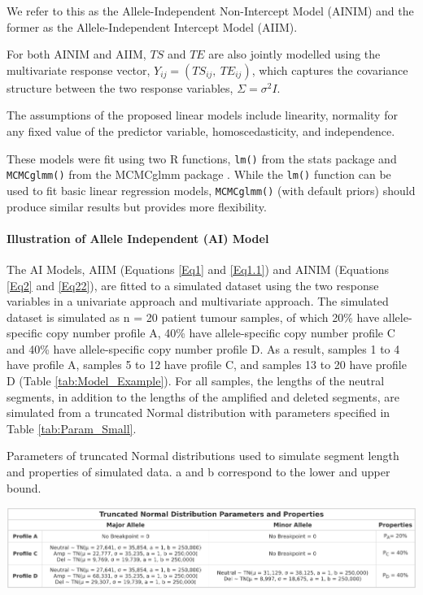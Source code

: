 We refer to this as the Allele-Independent Non-Intercept Model (AINIM) and the former as the Allele-Independent Intercept Model (AIIM). 

For both AINIM and AIIM, $TS$ and $TE$ are also jointly modelled using the multivariate response vector, $Y_{ij}=(TS_{ij},\:TE_{ij})$, which captures the covariance structure between the two response variables, $\Sigma = \sigma^2 \textit{I}$. 

The assumptions of the proposed linear models include linearity, normality for any fixed value of the predictor variable, homoscedasticity, and independence. 

These models were fit using two R functions, \texttt{lm()} from the stats package \citep{stats} and \texttt{MCMCglmm()} from the MCMCglmm package \citep{MCMCglmm}. While the \texttt{lm()} function can be used to fit basic linear regression models, \texttt{MCMCglmm()} (with default priors) should produce similar results but provides more flexibility. 

\paragraph{Illustration of Allele Independent (AI) Model}
\hfill
\newline

\noindent The AI Models, AIIM (Equations \ref{Eq1} and \ref{Eq1.1}) and AINIM (Equations \ref{Eq2} and \ref{Eq22}), are fitted to a simulated dataset using the two response variables in a univariate approach and multivariate approach. The simulated dataset is simulated as n = 20 patient tumour samples, of which 20\% have allele-specific copy number profile A, 40\% have allele-specific copy number profile C and 40\% have allele-specific copy number profile D. As a result, samples 1 to 4 have profile A, samples 5 to 12 have profile C, and samples 13 to 20 have profile D (Table \ref{tab:Model_Example}). For all samples, the lengths of the neutral segments, in addition to the lengths of the amplified and deleted segments, are simulated from a truncated Normal distribution with parameters specified in Table \ref{tab:Param_Small}. 

\begin{table}[!htb]
\center
\caption[Parameters of truncated Normal distributions used to simulate segment length and properties of simulated data.]{Parameters of truncated Normal distributions used to simulate segment length and properties of simulated data. a and b correspond to the lower and upper bound.}
\includegraphics[width = 1\textwidth]{../tables/Chapter_5/TN_Distribution_2.png}
\label{tab:Param_Small}
\end{table}

